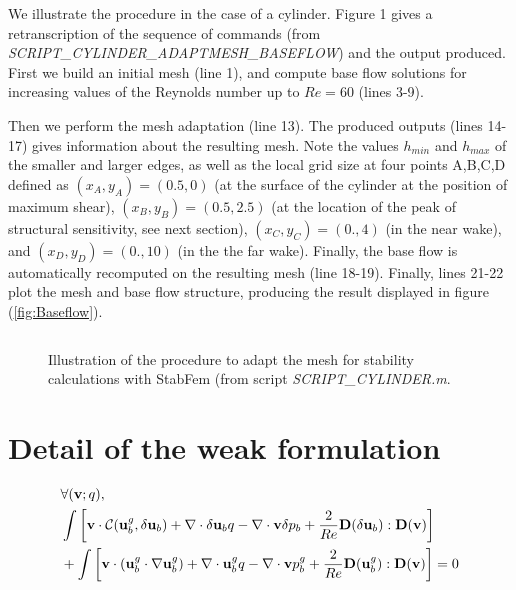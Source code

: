 \documentclass[twocolumn,10pt]{asme2ej}
\begin{document}
We illustrate the procedure in the case of a cylinder.  Figure 1 gives a retranscription of the sequence of commands (from {\em SCRIPT\_CYLINDER\_ADAPTMESH\_BASEFLOW}) 
and the output produced.
First we build an initial mesh (line 1), and compute base flow solutions for increasing values of the Reynolds number up to $Re = 60$ (lines 3-9).

Then we perform the mesh adaptation (line 13). The produced outputs (lines 14-17) gives information about the resulting mesh. 
Note the values $h_{min}$ and $h_{max}$ of the smaller and larger edges, as well as the local grid size at four points A,B,C,D defined as $(x_A,y_A) = (0.5,0)$ (at the surface of the cylinder at the position of maximum shear), $(x_B,y_B) = (0.5,2.5)$ (at the location of the peak of structural sensitivity, see next section), $(x_C,y_C) = (0.,4)$ (in the near wake), and $(x_D,y_D) = (0.,10)$ (in the the far wake). Finally, the base flow is automatically recomputed on the resulting mesh (line 18-19). Finally, lines 21-22 plot the mesh and base flow structure, producing the result displayed in figure (\ref{fig:Baseflow}).



\begin{figure*}
\small
\begin{lstlisting}
\end{lstlisting}
\normalsize

\caption{Illustration of the procedure to adapt the mesh for stability calculations with StabFem (from script {\em SCRIPT\_CYLINDER.m}. }
\label{listing3}
\end{figure*}


\section{Detail of the weak formulation}
\begin{eqnarray}
\label{NewtonWeak}
&\forall ({\bf v};q), \\
\displaystyle &\int \left[ {\bf v} \cdot {\cal C}( {\bf u}_b^g , \delta {\bf u}_b) +  \nabla  \cdot \delta {\bf u}_b q -\nabla  \cdot {\bf v} \delta p_b
+ \frac{2}{Re} {\bf D}(\delta {\bf u}_b) : {\bf D}({\bf v}) \right]
\nonumber
\\
\nonumber
\displaystyle & + \int \left[ {\bf v} \cdot ( {\bf u}_b^g \cdot \nabla {\bf u}_b^g) 
+ \nabla \cdot {\bf u}_b^g  q 
- \nabla \cdot {\bf v} p_b^g
+ \frac{2}{Re} {\bf D}({\bf u}_b^g) : {\bf D}({\bf v}) \right] = 0 
\end{eqnarray}
\end{document}
